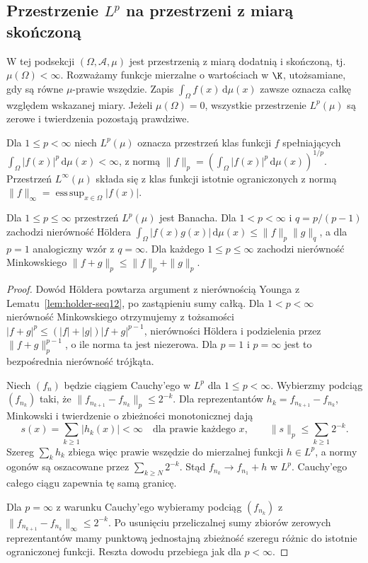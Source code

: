 \subsection{Przestrzenie \texorpdfstring{$L^p$}{Lp} na przestrzeni z miarą skończoną}

W tej podsekcji $(\Omega,\mathcal A,\mu)$ jest przestrzenią
z miarą dodatnią i skończoną, tj. $\mu(\Omega)<\infty$.
Rozważamy funkcje mierzalne o wartościach w $\K$, utożsamiane,
gdy są równe $\mu$-prawie wszędzie. Zapis
$\int_\Omega f(x)\,\mathrm d\mu(x)$ zawsze oznacza całkę
względem wskazanej miary. Jeżeli $\mu(\Omega)=0$, wszystkie
przestrzenie $L^p(\mu)$ są zerowe i twierdzenia pozostają prawdziwe.

\begin{definicja}[Przestrzenie $L^p(\mu)$]
\label{def:lp12}
Dla $1\le p<\infty$ niech $L^p(\mu)$ oznacza przestrzeń
klas funkcji $f$ spełniających
$\int_\Omega|f(x)|^p\,\mathrm d\mu(x)<\infty$, z normą
$\|f\|_p=(\int_\Omega|f(x)|^p\,\mathrm d\mu(x))^{1/p}$.
Przestrzeń $L^\infty(\mu)$ składa się z klas funkcji istotnie
ograniczonych z normą
$\|f\|_\infty=\operatorname*{ess\,sup}_{x\in\Omega}|f(x)|$.
\end{definicja}

\begin{twierdzenie}
\label{thm:lp-banach12}
Dla $1\le p\le\infty$ przestrzeń $L^p(\mu)$ jest Banacha.
Dla $1<p<\infty$ i $q=p/(p-1)$ zachodzi nierówność H\"oldera
$\int_\Omega|f(x)g(x)|\,\mathrm d\mu(x)\le\|f\|_p\|g\|_q$,
a dla $p=1$ analogiczny wzór z $q=\infty$.
Dla każdego $1\le p\le\infty$ zachodzi nierówność Minkowskiego
$\|f+g\|_p\le\|f\|_p+\|g\|_p$.
\end{twierdzenie}
\begin{proof}
Dowód H\"oldera powtarza argument z nierównością Younga
z Lematu~\ref{lem:holder-seq12}, po zastąpieniu sumy całką.
Dla $1<p<\infty$ nierówność Minkowskiego otrzymujemy z tożsamości
$|f+g|^p\le(|f|+|g|)|f+g|^{p-1}$, nierówności H\"oldera
i podzielenia przez $\|f+g\|_p^{p-1}$, o ile norma ta jest
niezerowa. Dla $p=1$ i $p=\infty$ jest to bezpośrednia
nierówność trójkąta.

Niech $(f_n)$ będzie ciągiem Cauchy'ego w $L^p$ dla
$1\le p<\infty$. Wybierzmy podciąg $(f_{n_k})$ taki, że
$\|f_{n_{k+1}}-f_{n_k}\|_p\le2^{-k}$.
Dla reprezentantów $h_k=f_{n_{k+1}}-f_{n_k}$,
Minkowski i twierdzenie o zbieżności monotonicznej dają
\[
 s(x)=\sum_{k\ge1}|h_k(x)|<\infty\quad\text{dla prawie każdego }x,
 \qquad \|s\|_p\le\sum_{k\ge1}2^{-k}.
\]
Szereg $\sum_kh_k$ zbiega więc prawie wszędzie do mierzalnej
funkcji $h\in L^p$, a normy ogonów są oszacowane przez
$\sum_{k\ge N}2^{-k}$. Stąd $f_{n_k}\to f_{n_1}+h$ w $L^p$.
Cauchy'ego całego ciągu zapewnia tę samą granicę.

Dla $p=\infty$ z warunku Cauchy'ego wybieramy podciąg
$(f_{n_k})$ z $\|f_{n_{k+1}}-f_{n_k}\|_\infty\le2^{-k}$.
Po usunięciu przeliczalnej sumy zbiorów zerowych
reprezentantów mamy punktową jednostajną zbieżność
szeregu różnic do istotnie ograniczonej funkcji.
Reszta dowodu przebiega jak dla $p<\infty$.
\end{proof}

